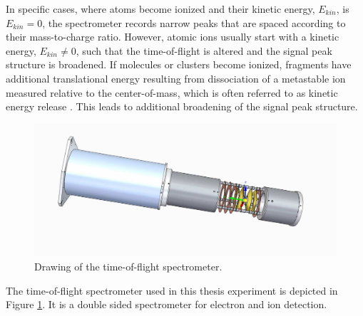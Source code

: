 In specific cases, where atoms become ionized and their kinetic energy, $E_{kin}$, is $E_{kin}=0$, the spectrometer records narrow peaks that are spaced according to their mass-to-charge ratio. However, atomic ions usually start with a kinetic energy, $E_{kin}\neq 0$, such that the time-of-flight is altered and the signal peak structure is broadened. If molecules or clusters become ionized, fragments have additional translational energy resulting from dissociation of a metastable ion measured relative to the center-of-mass, which is often referred to as kinetic energy release \citep{Murray-2013-IUPAC}. This leads to additional broadening of the signal peak structure.\\[1\baselineskip]
\begin{figure}
   \includegraphics[width=1.\linewidth]{images/spectrometer.jpg}
    \caption{Drawing of the time-of-flight spectrometer.}
\label{fig:spectrometer-detail}
\end{figure}
The time-of-flight spectrometer used in this thesis experiment is depicted in Figure \ref{fig:spectrometer-detail}. It is a double sided spectrometer for electron and ion detection. %
